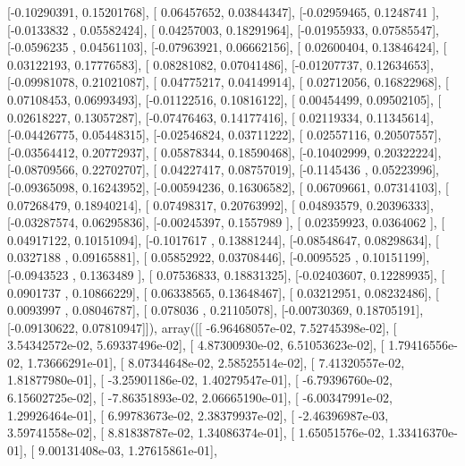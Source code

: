 \documentclass{article}
\begin{document}
       [-0.10290391,  0.15201768],
       [ 0.06457652,  0.03844347],
       [-0.02959465,  0.1248741 ],
       [-0.0133832 ,  0.05582424],
       [ 0.04257003,  0.18291964],
       [-0.01955933,  0.07585547],
       [-0.0596235 ,  0.04561103],
       [-0.07963921,  0.06662156],
       [ 0.02600404,  0.13846424],
       [ 0.03122193,  0.17776583],
       [ 0.08281082,  0.07041486],
       [-0.01207737,  0.12634653],
       [-0.09981078,  0.21021087],
       [ 0.04775217,  0.04149914],
       [ 0.02712056,  0.16822968],
       [ 0.07108453,  0.06993493],
       [-0.01122516,  0.10816122],
       [ 0.00454499,  0.09502105],
       [ 0.02618227,  0.13057287],
       [-0.07476463,  0.14177416],
       [ 0.02119334,  0.11345614],
       [-0.04426775,  0.05448315],
       [-0.02546824,  0.03711222],
       [ 0.02557116,  0.20507557],
       [-0.03564412,  0.20772937],
       [ 0.05878344,  0.18590468],
       [-0.10402999,  0.20322224],
       [-0.08709566,  0.22702707],
       [ 0.04227417,  0.08757019],
       [-0.1145436 ,  0.05223996],
       [-0.09365098,  0.16243952],
       [-0.00594236,  0.16306582],
       [ 0.06709661,  0.07314103],
       [ 0.07268479,  0.18940214],
       [ 0.07498317,  0.20763992],
       [ 0.04893579,  0.20396333],
       [-0.03287574,  0.06295836],
       [-0.00245397,  0.1557989 ],
       [ 0.02359923,  0.0364062 ],
       [ 0.04917122,  0.10151094],
       [-0.1017617 ,  0.13881244],
       [-0.08548647,  0.08298634],
       [ 0.0327188 ,  0.09165881],
       [ 0.05852922,  0.03708446],
       [-0.0095525 ,  0.10151199],
       [-0.0943523 ,  0.1363489 ],
       [ 0.07536833,  0.18831325],
       [-0.02403607,  0.12289935],
       [ 0.0901737 ,  0.10866229],
       [ 0.06338565,  0.13648467],
       [ 0.03212951,  0.08232486],
       [ 0.0093997 ,  0.08046787],
       [ 0.078036  ,  0.21105078],
       [-0.00730369,  0.18705191],
       [-0.09130622,  0.07810947]]), array([[ -6.96468057e-02,   7.52745398e-02],
       [  3.54342572e-02,   5.69337496e-02],
       [  4.87300930e-02,   6.51053623e-02],
       [  1.79416556e-02,   1.73666291e-01],
       [  8.07344648e-02,   2.58525514e-02],
       [  7.41320557e-02,   1.81877980e-01],
       [ -3.25901186e-02,   1.40279547e-01],
       [ -6.79396760e-02,   6.15602725e-02],
       [ -7.86351893e-02,   2.06665190e-01],
       [ -6.00347991e-02,   1.29926464e-01],
       [  6.99783673e-02,   2.38379937e-02],
       [ -2.46396987e-03,   3.59741558e-02],
       [  8.81838787e-02,   1.34086374e-01],
       [  1.65051576e-02,   1.33416370e-01],
       [  9.00131408e-03,   1.27615861e-01],
\end{document}
